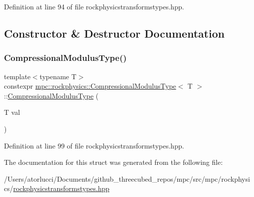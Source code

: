 Definition at line 94 of file rockphysicstransformstypes.\+hpp.



\subsection{Constructor \& Destructor Documentation}
\mbox{\label{structmpc_1_1rockphysics_1_1_compressional_modulus_type_abdc02663a7781e7aa90f198d165901a9}} 
\subsubsection{\texorpdfstring{Compressional\+Modulus\+Type()}{CompressionalModulusType()}}
{\footnotesize\ttfamily template$<$typename T$>$ \\
constexpr \mbox{\hyperlink{structmpc_1_1rockphysics_1_1_compressional_modulus_type}{mpc\+::rockphysics\+::\+Compressional\+Modulus\+Type}}$<$ T $>$\+::\mbox{\hyperlink{structmpc_1_1rockphysics_1_1_compressional_modulus_type}{Compressional\+Modulus\+Type}} (\begin{DoxyParamCaption}\item[{T}]{val }\end{DoxyParamCaption})\hspace{0.3cm}{\ttfamily [inline]}}



Definition at line 99 of file rockphysicstransformstypes.\+hpp.



The documentation for this struct was generated from the following file\+:\begin{DoxyCompactItemize}
\item 
/\+Users/atorlucci/\+Documents/github\+\_\+threecubed\+\_\+repos/mpc/src/mpc/rockphysics/\mbox{\hyperlink{rockphysicstransformstypes_8hpp}{rockphysicstransformstypes.\+hpp}}\end{DoxyCompactItemize}
